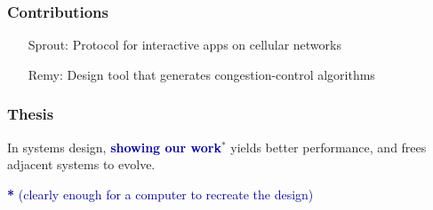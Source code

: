 \documentclass[svgnames]{beamer}
\begin{document}
\begin{frame}
\frametitle{Contributions}

\begin{itemize}

\item[Sprout:] Protocol for interactive apps on cellular networks


\item[]

\item[Remy:] Design tool that generates congestion-control algorithms


\item[]



%
%
%




\end{itemize}

\end{frame}

\begin{frame}
\frametitle{Thesis}

\Large

In systems design, \textbf{\textcolor{DarkBlue}{showing our
    work}$^{*}$} yields better performance, and frees adjacent systems
to evolve.

\vspace{\baselineskip}
\vspace{\baselineskip}
\vspace{\baselineskip}

\normalsize

\textcolor{DarkBlue}{\textbf{*} (clearly enough for a computer to recreate the design)}

\end{frame}
\end{document}
